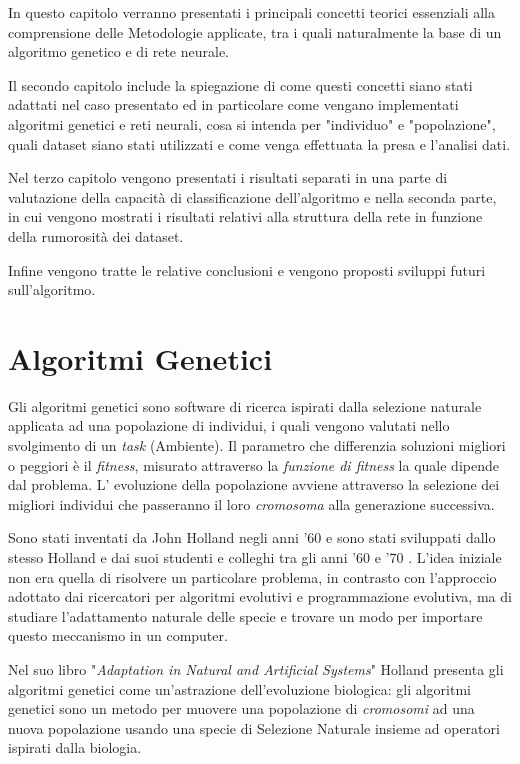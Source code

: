 \documentclass[12pt,a4paper]{report}
\begin{document}
In questo capitolo verranno presentati i principali concetti teorici essenziali alla comprensione delle Metodologie applicate, tra i quali naturalmente la base di un algoritmo genetico e di rete neurale.

Il secondo capitolo include la spiegazione di come questi concetti siano stati adattati nel caso presentato ed in particolare come vengano implementati algoritmi genetici e reti neurali, cosa si intenda per "individuo" e "popolazione", quali dataset siano stati utilizzati e come venga effettuata la presa e l'analisi dati.

Nel terzo capitolo vengono presentati i risultati separati in una parte di valutazione della capacità di classificazione dell'algoritmo e nella seconda parte, in cui vengono mostrati i risultati relativi alla struttura della rete in funzione della rumorosità dei dataset. 

Infine vengono tratte le relative conclusioni e vengono proposti sviluppi futuri sull'algoritmo.

\section{Algoritmi Genetici}\label{alg-gen} 

Gli algoritmi genetici sono software di ricerca ispirati dalla selezione naturale applicata ad una popolazione di individui, i quali vengono valutati nello svolgimento di un \textit{task} (Ambiente).
Il parametro che differenzia soluzioni migliori o peggiori è il \textit{fitness}, misurato attraverso la \textit{funzione di fitness} la quale dipende dal problema.
L' evoluzione della popolazione avviene attraverso la selezione dei migliori individui che passeranno il loro \textit{cromosoma} alla generazione successiva.

Sono stati inventati da John Holland negli anni '60 e sono stati sviluppati dallo stesso Holland e dai suoi studenti e colleghi tra gli anni '60 e '70 \cite{genetic-algorithm-mitchell}.
L'idea iniziale non era quella di risolvere un particolare problema, in contrasto con l'approccio adottato dai ricercatori per algoritmi evolutivi e programmazione evolutiva, ma di studiare l'adattamento naturale delle specie e trovare un modo per importare questo meccanismo in un computer.

Nel suo libro "\textit{Adaptation in Natural and Artificial Systems}" Holland presenta gli algoritmi genetici come un'astrazione dell'evoluzione biologica: gli algoritmi genetici sono un metodo per muovere una popolazione di \textit{cromosomi} ad una nuova popolazione usando una specie di Selezione Naturale insieme ad operatori ispirati dalla biologia.
         
\end{document}
